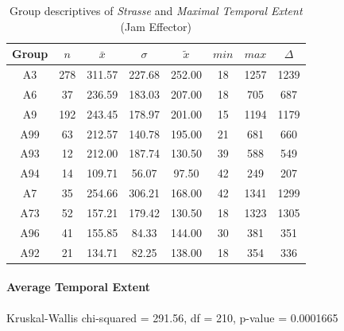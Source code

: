 \begin{table}[ht]
	\tiny
	\centering
	\begin{tabular}{c|c|c|c|c|c|c|c}
		\toprule
		Group & $n$ & $\bar{x}$ & $\sigma$ & $\tilde{x}$ & $min$ & $max$ & $\Delta$ \\
		\midrule
		A3   & 278 & 311.57 & 227.68 & 252.00 & 18 & 1257 & 1239 \\ 
		A6   & 37  & 236.59 & 183.03 & 207.00 & 18 & 705  & 687  \\ 
		A9   & 192 & 243.45 & 178.97 & 201.00 & 15 & 1194 & 1179 \\ 
		A99  & 63  & 212.57 & 140.78 & 195.00 & 21 & 681  & 660  \\ 
		A93  & 12  & 212.00 & 187.74 & 130.50 & 39 & 588  & 549  \\ 
		A94  & 14  & 109.71 & 56.07  & 97.50  & 42 & 249  & 207  \\ 
		A7   & 35  & 254.66 & 306.21 & 168.00 & 42 & 1341 & 1299 \\ 
		A73  & 52  & 157.21 & 179.42 & 130.50 & 18 & 1323 & 1305 \\ 
		A96  & 41  & 155.85 & 84.33  & 144.00 & 30 & 381  & 351  \\ 
		A92  & 21  & 134.71 & 82.25  & 138.00 & 18 & 354  & 336 \\ 
		\bottomrule
	  \end{tabular}
    \caption{Group descriptives of \textit{Strasse} and \textit{Maximal Temporal Extent} (Jam Effector)}
    \label{tbl:descriptives_baysis_effector_Strasse_TMax}
\end{table}

\paragraph{Average Temporal Extent}
Kruskal-Wallis chi-squared = 291.56, df = 210, p-value = 0.0001665

